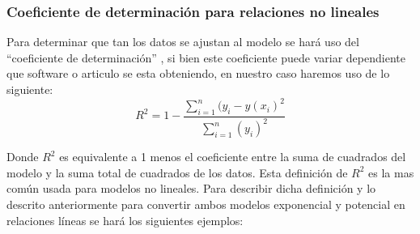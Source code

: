 \documentclass[11pt,letterpaper]{article}
\begin{document}
\subsubsection{Coeficiente de determinación para relaciones no lineales}
Para determinar que tan los datos se ajustan al modelo se hará uso del ``coeficiente de determinación'' , si bien este coeficiente puede variar dependiente que software o articulo se esta obteniendo, en nuestro caso haremos uso de lo siguiente:
\begin{equation}\label{equation:coeficiente}
	R^2 = 1 - \frac{\sum_{i=1}^{n} (y_i - y(x_i ) ^2 }
	{\sum_{i=1}^{n} (y_i)^2}
\end{equation}

Donde $R^2$ es equivalente a 1 menos el coeficiente entre la suma de cuadrados del modelo y la suma total de cuadrados de los datos. Esta definición de $R^2$ es la mas común usada para modelos no lineales. Para describir dicha definición y lo descrito anteriormente para convertir ambos modelos exponencial y potencial en relaciones líneas se hará los siguientes ejemplos:
\end{document}
